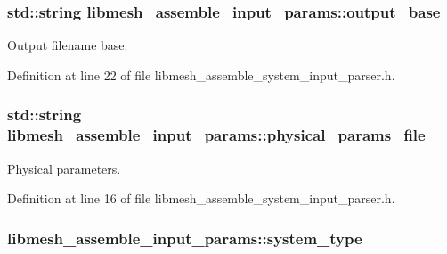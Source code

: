 \subsubsection[{output\+\_\+base}]{\setlength{\rightskip}{0pt plus 5cm}std\+::string libmesh\+\_\+assemble\+\_\+input\+\_\+params\+::output\+\_\+base}\label{structlibmesh__assemble__input__params_af6d7a41287b40d913e5110b115b0b692}


Output filename base. 



Definition at line 22 of file libmesh\+\_\+assemble\+\_\+system\+\_\+input\+\_\+parser.\+h.

\hypertarget{structlibmesh__assemble__input__params_a2aef9210c303764810d978496712e9b3}{}
\subsubsection[{physical\+\_\+params\+\_\+file}]{\setlength{\rightskip}{0pt plus 5cm}std\+::string libmesh\+\_\+assemble\+\_\+input\+\_\+params\+::physical\+\_\+params\+\_\+file}\label{structlibmesh__assemble__input__params_a2aef9210c303764810d978496712e9b3}


Physical parameters. 



Definition at line 16 of file libmesh\+\_\+assemble\+\_\+system\+\_\+input\+\_\+parser.\+h.

\hypertarget{structlibmesh__assemble__input__params_a030b78e020faf6210813844e8f0c2eca}{}
\subsubsection[{system\+\_\+type}]{ libmesh\+\_\+assemble\+\_\+input\+\_\+params\+::system\+\_\+type}\label{structlibmesh__assemble__input__params_a030b78e020faf6210813844e8f0c2eca}


